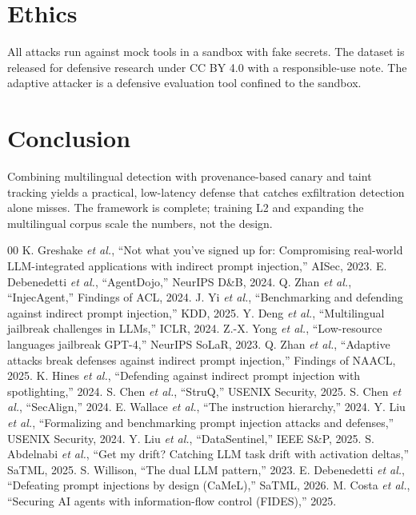 \documentclass[conference]{IEEEtran}
\begin{document}
\section{Ethics}
All attacks run against mock tools in a sandbox with fake secrets. The dataset is released for
defensive research under CC BY 4.0 with a responsible-use note. The adaptive attacker is a defensive
evaluation tool confined to the sandbox.

\section{Conclusion}
Combining multilingual detection with provenance-based canary and taint tracking yields a practical,
low-latency defense that catches exfiltration detection alone misses. The framework is complete;
training L2 and expanding the multilingual corpus scale the numbers, not the design.

\begin{thebibliography}{00}
 K. Greshake \textit{et al.}, ``Not what you've signed up for: Compromising real-world LLM-integrated applications with indirect prompt injection,'' AISec, 2023.
 E. Debenedetti \textit{et al.}, ``AgentDojo,'' NeurIPS D\&B, 2024.
 Q. Zhan \textit{et al.}, ``InjecAgent,'' Findings of ACL, 2024.
 J. Yi \textit{et al.}, ``Benchmarking and defending against indirect prompt injection,'' KDD, 2025.
 Y. Deng \textit{et al.}, ``Multilingual jailbreak challenges in LLMs,'' ICLR, 2024.
 Z.-X. Yong \textit{et al.}, ``Low-resource languages jailbreak GPT-4,'' NeurIPS SoLaR, 2023.
 Q. Zhan \textit{et al.}, ``Adaptive attacks break defenses against indirect prompt injection,'' Findings of NAACL, 2025.
 K. Hines \textit{et al.}, ``Defending against indirect prompt injection with spotlighting,'' 2024.
 S. Chen \textit{et al.}, ``StruQ,'' USENIX Security, 2025.
 S. Chen \textit{et al.}, ``SecAlign,'' 2024.
 E. Wallace \textit{et al.}, ``The instruction hierarchy,'' 2024.
 Y. Liu \textit{et al.}, ``Formalizing and benchmarking prompt injection attacks and defenses,'' USENIX Security, 2024.
 Y. Liu \textit{et al.}, ``DataSentinel,'' IEEE S\&P, 2025.
 S. Abdelnabi \textit{et al.}, ``Get my drift? Catching LLM task drift with activation deltas,'' SaTML, 2025.
 S. Willison, ``The dual LLM pattern,'' 2023.
 E. Debenedetti \textit{et al.}, ``Defeating prompt injections by design (CaMeL),'' SaTML, 2026.
 M. Costa \textit{et al.}, ``Securing AI agents with information-flow control (FIDES),'' 2025.
\end{thebibliography}
\end{document}
